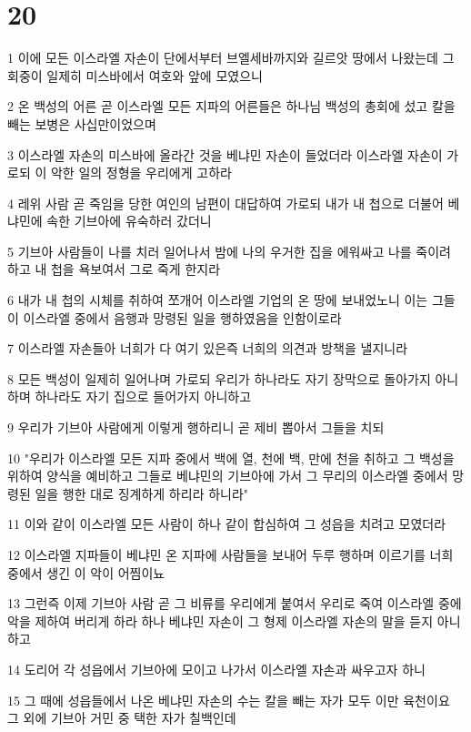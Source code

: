 \chapter{20}

\par 1 이에 모든 이스라엘 자손이 단에서부터 브엘세바까지와 길르앗 땅에서 나왔는데 그 회중이 일제히 미스바에서 여호와 앞에 모였으니
\par 2 온 백성의 어른 곧 이스라엘 모든 지파의 어른들은 하나님 백성의 총회에 섰고 칼을 빼는 보병은 사십만이었으며
\par 3 이스라엘 자손의 미스바에 올라간 것을 베냐민 자손이 들었더라 이스라엘 자손이 가로되 이 악한 일의 정형을 우리에게 고하라
\par 4 레위 사람 곧 죽임을 당한 여인의 남편이 대답하여 가로되 내가 내 첩으로 더불어 베냐민에 속한 기브아에 유숙하러 갔더니
\par 5 기브아 사람들이 나를 치러 일어나서 밤에 나의 우거한 집을 에워싸고 나를 죽이려 하고 내 첩을 욕보여서 그로 죽게 한지라
\par 6 내가 내 첩의 시체를 취하여 쪼개어 이스라엘 기업의 온 땅에 보내었노니 이는 그들이 이스라엘 중에서 음행과 망령된 일을 행하였음을 인함이로라
\par 7 이스라엘 자손들아 너희가 다 여기 있은즉 너희의 의견과 방책을 낼지니라
\par 8 모든 백성이 일제히 일어나며 가로되 우리가 하나라도 자기 장막으로 돌아가지 아니하며 하나라도 자기 집으로 들어가지 아니하고
\par 9 우리가 기브아 사람에게 이렇게 행하리니 곧 제비 뽑아서 그들을 치되
\par 10 "우리가 이스라엘 모든 지파 중에서 백에 열, 천에 백, 만에 천을 취하고 그 백성을 위하여 양식을 예비하고 그들로 베냐민의 기브아에 가서 그 무리의 이스라엘 중에서 망령된 일을 행한 대로 징계하게 하리라 하니라"
\par 11 이와 같이 이스라엘 모든 사람이 하나 같이 합심하여 그 성읍을 치려고 모였더라
\par 12 이스라엘 지파들이 베냐민 온 지파에 사람들을 보내어 두루 행하며 이르기를 너희 중에서 생긴 이 악이 어찜이뇨
\par 13 그런즉 이제 기브아 사람 곧 그 비류를 우리에게 붙여서 우리로 죽여 이스라엘 중에 악을 제하여 버리게 하라 하나 베냐민 자손이 그 형제 이스라엘 자손의 말을 듣지 아니하고
\par 14 도리어 각 성읍에서 기브아에 모이고 나가서 이스라엘 자손과 싸우고자 하니
\par 15 그 때에 성읍들에서 나온 베냐민 자손의 수는 칼을 빼는 자가 모두 이만 육천이요 그 외에 기브아 거민 중 택한 자가 칠백인데
